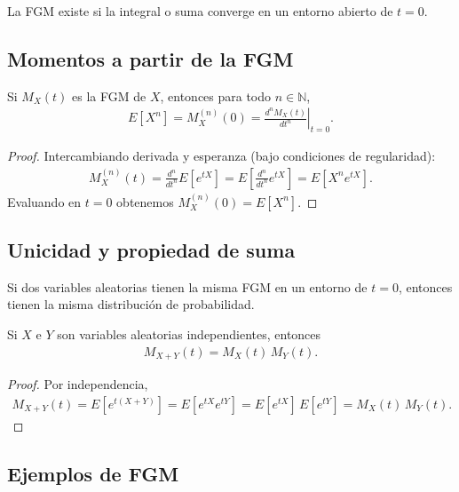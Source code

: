 La FGM existe si la integral o suma converge en un entorno abierto de $t=0$.

\subsection{Momentos a partir de la FGM}

\begin{teorema}
Si $M_X(t)$ es la FGM de $X$, entonces para todo $n \in \mathbb{N}$,
\begin{align}
 \label{eq:2.8.12}
 E\!\left[X^n\right] = M_X^{(n)}(0) = \left.\frac{d^n M_X(t)}{dt^n}\right|_{t=0}.
\end{align}
\end{teorema}

\begin{proof}
Intercambiando derivada y esperanza (bajo condiciones de regularidad):
\begin{align}
 M_X^{(n)}(t) = \frac{d^n}{dt^n}E[e^{tX}] = E\!\left[\frac{d^n}{dt^n}e^{tX}\right]
 = E\!\left[X^n e^{tX}\right].
\end{align}
Evaluando en $t=0$ obtenemos $M_X^{(n)}(0) = E[X^n]$.
\end{proof}

\subsection{Unicidad y propiedad de suma}

\begin{teorema}[Unicidad]
Si dos variables aleatorias tienen la misma FGM en un entorno de $t=0$, entonces tienen
la misma distribución de probabilidad.
\end{teorema}

\begin{teorema}
Si $X$ e $Y$ son variables aleatorias independientes, entonces
\begin{align}
 \label{eq:2.8.13}
 M_{X+Y}(t) = M_X(t)\,M_Y(t).
\end{align}
\end{teorema}

\begin{proof}
Por independencia,
\begin{align}
 M_{X+Y}(t) = E[e^{t(X+Y)}] = E[e^{tX}e^{tY}] = E[e^{tX}]\,E[e^{tY}] = M_X(t)\,M_Y(t).
\end{align}
\end{proof}

\subsection{Ejemplos de FGM}

